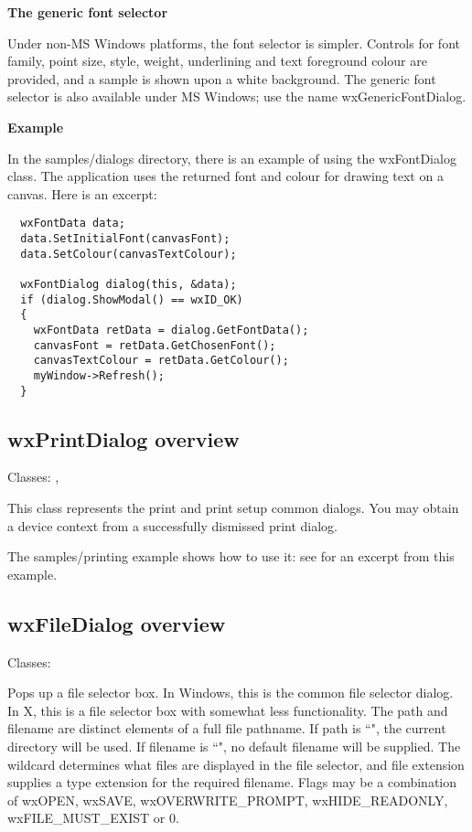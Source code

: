 {\bf The generic font selector}

Under non-MS Windows platforms, the font selector is simpler.
Controls for font family, point size, style, weight,
underlining and text foreground colour are provided, and
a sample is shown upon a white background. The generic font selector
is also available under MS Windows; use the name wxGenericFontDialog.

{\bf Example}

In the samples/dialogs directory, there is an example of using
the wxFontDialog class. The application uses the returned font
and colour for drawing text on a canvas. Here is an excerpt:

\begin{verbatim}
  wxFontData data;
  data.SetInitialFont(canvasFont);
  data.SetColour(canvasTextColour);
      
  wxFontDialog dialog(this, &data);
  if (dialog.ShowModal() == wxID_OK)
  {
    wxFontData retData = dialog.GetFontData();
    canvasFont = retData.GetChosenFont();
    canvasTextColour = retData.GetColour();
    myWindow->Refresh();
  }
\end{verbatim}

\subsection{wxPrintDialog overview}\label{wxprintdialogoverview}

Classes: , 

This class represents the print and print setup common dialogs.
You may obtain a  device context from
a successfully dismissed print dialog.

The samples/printing example shows how to use it: see  for
an excerpt from this example.

\subsection{wxFileDialog overview}\label{wxfiledialogoverview}

Classes: 

Pops up a file selector box. In Windows, this is the common file selector
dialog. In X, this is a file selector box with somewhat less functionality.
The path and filename are distinct elements of a full file pathname.
If path is ``", the current directory will be used. If filename is ``",
no default filename will be supplied. The wildcard determines what files
are displayed in the file selector, and file extension supplies a type
extension for the required filename. Flags may be a combination of wxOPEN,
wxSAVE, wxOVERWRITE\_PROMPT, wxHIDE\_READONLY, wxFILE\_MUST\_EXIST or 0. 

